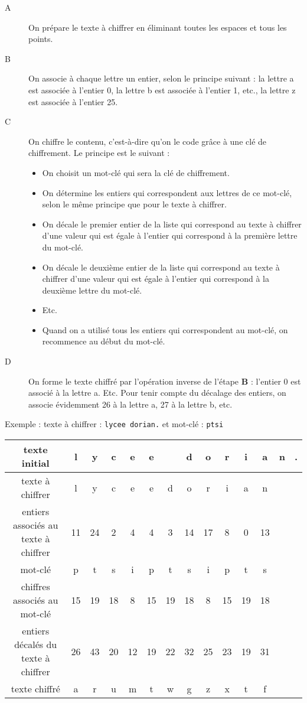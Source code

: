 \begin{description}
\item[A] On prépare le texte à chiffrer en éliminant toutes les espaces et tous les points.

\item[B] On associe à chaque lettre un entier, selon le principe suivant : la lettre a est associée à l'entier 0, la lettre b est associée à l'entier 1, etc., la lettre z est associée à l'entier 25.

\item[C] On chiffre le contenu, c'est-à-dire qu'on le code grâce à une clé de chiffrement. Le principe est le suivant :
\begin{itemize}
 \item On choisit un mot-clé qui sera la clé de chiffrement.
 \item On détermine les entiers qui correspondent aux lettres de ce mot-clé, selon le même principe  que pour le texte à chiffrer.
 \item On décale le premier entier de la liste qui correspond au texte à chiffrer d'une valeur qui est égale à l'entier qui correspond à la première lettre du mot-clé.
 \item On décale le deuxième entier de la liste qui correspond au texte à chiffrer d'une valeur qui est égale à l'entier qui correspond à la deuxième lettre du mot-clé.
 \item Etc. 
 \item Quand on a utilisé tous les entiers qui correspondent au mot-clé, on recommence au début du mot-clé.
\end{itemize}

\item[D] On forme le texte chiffré par l'opération inverse de l'étape \textbf{B} : l'entier 0 est associé à la lettre a. Etc. Pour tenir compte du décalage des entiers, on associe évidemment 26 à la lettre a, 27 à la lettre b, etc.  
\end{description}

Exemple : texte à chiffrer : \verb|lycee dorian.| et mot-clé : \verb|ptsi|

\begin{center}
\begin{tabular}{|c|c|c|c|c|c|c|c|c|c|c|c|c|c|}\hline
texte initial & l & y & c & e & e & & d & o & r & i & a & n & .\\\hline
texte à chiffrer & l & y & c & e & e & d & o & r & i & a & n &&\\\hline
entiers associés au texte à chiffrer & 11 & 24 & 2 & 4 & 4 & 3 & 14 & 17 & 8 & 0 & 13 &&\\\hline
mot-clé & p & t & s & i & p & t & s & i & p & t & s &&\\\hline
chiffres associés au mot-clé & 15 & 19 & 18 & 8 & 15 & 19 & 18 & 8 & 15 & 19 & 18 &&\\\hline
entiers décalés du texte à chiffrer & 26 & 43 & 20 & 12 & 19 & 22 & 32 & 25 & 23 & 19 & 31 &&\\\hline
texte chiffré & a & r & u & m & t & w & g & z & x & t & f &&\\\hline
\end{tabular}
\end{center}

